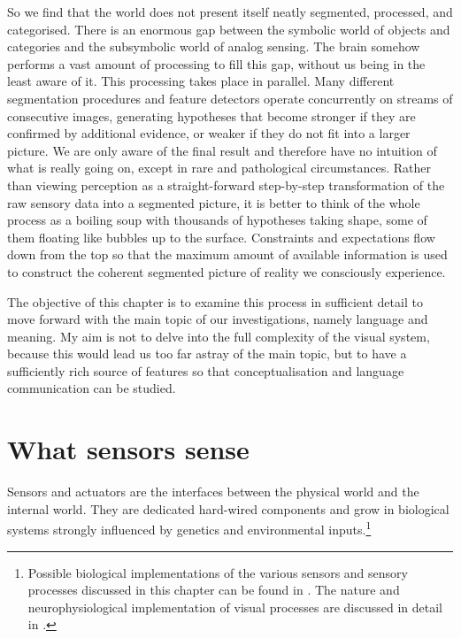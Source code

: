 So we find that the world does not present itself neatly segmented, 
processed, and categorised. There is an enormous 
gap between the symbolic world of objects and categories
and the subsymbolic world of analog sensing. 
The brain somehow performs a vast amount of processing
to fill this gap, without us being in the least aware of it. 
This processing takes place in parallel. Many different
segmentation procedures and feature detectors 
operate concurrently on streams of consecutive images, 
generating hypotheses that become stronger if they are
confirmed by additional evidence, or weaker if 
they do not fit into a larger picture. We are only 
aware of the final result and therefore have no 
intuition of what is really going on, except
in rare and pathological circumstances. 
Rather than viewing perception as a straight-forward step-by-step
transformation of the raw sensory data into a segmented
picture, it is better to think of the whole process
as a boiling soup with thousands of hypotheses taking
shape, some of them floating like bubbles up to the surface. Constraints
and expectations flow down from the top so that the maximum 
amount of available information is used to construct the 
coherent segmented picture of reality we consciously experience. 

The objective of this chapter is to examine this 
process in sufficient detail to move forward with the main
topic of our investigations, namely language and meaning. My 
aim is not to delve into the full complexity of the 
visual system, because this would lead us too far 
astray of the main topic, but to have a sufficiently 
rich source of features so that conceptualisation and 
language communication can be studied. 

\section{What sensors sense}

Sensors and actuators are the interfaces between the physical
world and the internal world. 
They are dedicated hard-wired components and grow in biological 
systems strongly influenced by genetics and environmental inputs.\footnote{Possible 
biological implementations of the various 
sensors and sensory processes discussed in this chapter 
can be found in \cite{Churchland:1992}. The 
nature and neurophysiological implementation of visual
processes are discussed in detail in \cite{Zeki:1993}.}

